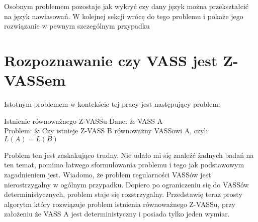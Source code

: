     Osobnym problemem pozostaje jak wykryć czy dany język można przekształcić na język nawiasowań.
    W kolejnej sekcji wrócę do tego problemu i pokaże jego rozwiązanie w pewnym szczególnym przypadku


    \section{Rozpoznawanie czy VASS jest Z-VASSem}
    Istotnym problemem w kontekście tej pracy jest następujący problem:

    \begin{problem}[]{Istnienie równoważnego Z-VASSu}
        Dane: & VASS A\\
        Problem: & Czy istnieje Z-VASS B równoważny VASSowi A, czyli $L(A) = L(B)$ \\
    \end{problem}
    Problem ten jest zaskakująco trudny.
    Nie udało mi się znaleźć żadnych badań na ten temat, pomimo łatwego sformułowania problemu i tego jak podstawowym zagadnieniem jest.
    Wiadomo, że problem regularności VASSów jest nierostrzygalny w ogólnym przypadku\cite{regularity-checking}.
    Dopiero po ograniczeniu się do VASSów deterministycznych, problem staje się rozstrzygalny.
    Przedstawię teraz prosty algorytm który rozwiązuje problem istnienia równoważnego Z-VASSu, przy założeniu że VASS A
    jest deterministyczny i posiada tylko jeden wymiar.

